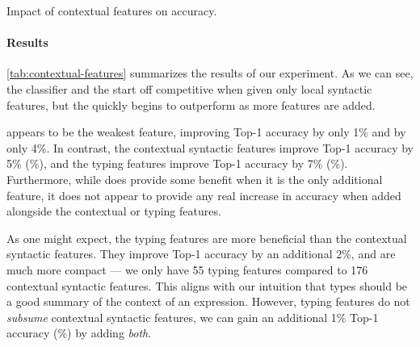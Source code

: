 \begin{table}[ht]
  \caption{
    Impact of contextual features on accuracy.
  }\label{tab:contextual-features}
\end{table}

\paragraph{Results}
\autoref{tab:contextual-features} summarizes the results of our experiment.
%
As we can see, the \linear classifier and the \hiddenFH start off
competitive when given only local syntactic features, but the \hiddenFH
quickly begins to outperform as more features are added.

\ExprSize appears to be the weakest feature, improving \linear Top-1
accuracy by only 1\% and \hiddenFH by only 4\%.
%
In contrast, the contextual syntactic features improve \linear Top-1
accuracy by 5\% (\%), and the typing features improve
Top-1 accuracy by 7\% (\%).
%
Furthermore, while \ExprSize does provide some benefit when it is the
only additional feature, it does not appear to provide any real increase
in accuracy when added alongside the contextual or typing features.

As one might expect, the typing features are more beneficial than the
contextual syntactic features.
%
They improve Top-1 accuracy by an additional 2\%, and are much more
compact --- we only have 55 typing features compared to 176 contextual
syntactic features.
%
This aligns with our intuition that types should be a good summary of
the context of an expression.
%
However, typing features do not \emph{subsume} contextual syntactic
features, we can gain an additional 1\% Top-1 accuracy (\%) by
adding \emph{both}.
